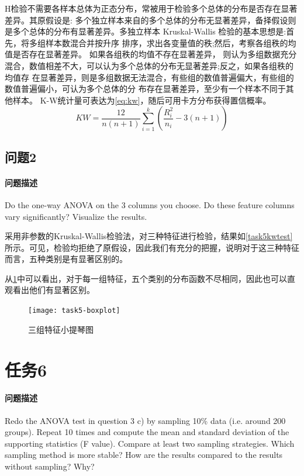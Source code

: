\documentclass[a4paper,12pt]{article}
\begin{document}
    H检验不需要各样本总体为正态分布，常被用于检验多个总体的分布是否存在显著差异。其原假设是: 多个独立样本来自的多个总体的分布无显著差异，备择假设则是多个总体的分布有显著差异。多独立样本 Kruskal-Wallis 检验的基本思想是:首先，将多组样本数混合并按升序 排序，求出各变量值的秩;然后，考察各组秩的均值是否存在显著差异。 如果各组秩的均值不存在显著差异， 则认为多组数据充分混合，数值相差不大，可以认为多个总体的分布无显著差异;反之，如果各组秩的均值存 在显著差异，则是多组数据无法混合，有些组的数值普遍偏大，有些组的数值普遍偏小，可认为多个总体的分 布存在显著差异，至少有一个样本不同于其他样本。\cite{张林泉2014多独立样本}
    K-W统计量可表达为\cref{eq:kw}，随后可用卡方分布获得置信概率。
    \begin{equation}
      \label{eq:kw}
      KW = \frac{12}{n(n+1)}\sum_{i=1}^k{(\frac{R_i^2}{n_i}-3(n+1))}
    \end{equation}
    \subsection{问题2}
    \paragraph{问题描述} Do the one-way ANOVA on the 3 columns you choose. Do these feature columns vary significantly? Visualize the results.

    采用非参数的Kruskal-Wallis检验法，对三种特征进行检验，结果如\cref{task5kwtest}所示。可见，检验均拒绝了原假设，因此我们有充分的把握，说明对于这三种特征而言，五种类别是有显著区别的。
    

    从\cref{fig:violin3}中可以看出，对于每一组特征，五个类别的分布函数不尽相同，因此也可以直观看出他们有显著区别。
    \begin{figure}
      \centering
      \texttt{[image: task5-boxplot]}
      \caption{三组特征小提琴图}
      \label{fig:violin3}
    \end{figure}

    \section{任务6} %
    \paragraph{问题描述} Redo the ANOVA test in question 3 c) by sampling 10\% data (i.e. around 200 groups). Repeat 10 times and compute the mean and standard deviation of the supporting statistics (F value). Compare at least two sampling strategies. Which sampling method is more stable? How are the results compared to the results without sampling? Why?
\end{document}
